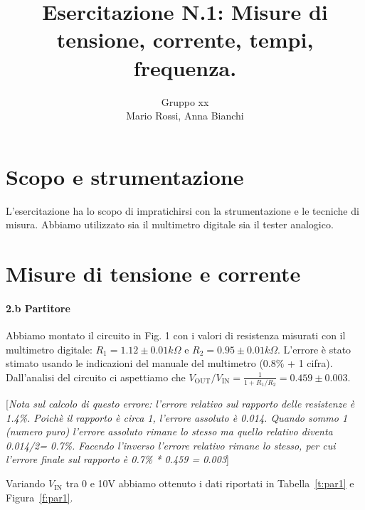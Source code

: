 \documentclass[10pt,a4paper]{article}
\author{Gruppo xx \\ Mario Rossi, Anna Bianchi \rem{non dimenticate i nomi}}
\title{Esercitazione N.1: Misure di tensione, corrente, tempi, frequenza.}
\newcommand{\rem}[1]{[\emph{#1}]}
\begin{document}
\maketitle

\section{Scopo e strumentazione}

L'esercitazione ha lo scopo di impratichirsi con la strumentazione e le tecniche di misura. 
Abbiamo utilizzato sia il multimetro digitale sia il tester analogico. 

\section{Misure di tensione e corrente}
\paragraph{2.b Partitore}
Abbiamo montato il circuito in Fig. 1 con i valori di resistenza misurati con il multimetro digitale: $R_1 = 1.12\pm 0.01 k\Omega$ e $R_2 = 0.95\pm 0.01 k\Omega$. L'errore \`e stato stimato usando le indicazioni del manuale del multimetro ($0.8\%$ + 1 cifra). 
Dall'analisi del circuito ci aspettiamo che $V_\mathrm{OUT}/V_\mathrm{IN} = \frac{1}{1+R_1/R_2}= 0.459 \pm 0.003 $.

\rem{Nota sul calcolo di questo errore: l'errore relativo sul rapporto delle resistenze \`e 1.4\%. Poich\`e il rapporto \`e circa 1, l'errore assoluto \`e 0.014. Quando sommo 1 (numero puro) l'errore assoluto rimane lo stesso ma quello relativo diventa 0.014/2= 0.7\%. Facendo l'inverso l'errore relativo rimane lo stesso, per cui l'errore finale sul rapporto \`e 0.7\% * 0.459 = 0.003}

Variando $V_\mathrm{IN}$ tra 0 e 10V abbiamo ottenuto i dati riportati in Tabella~\ref{t:par1} e Figura~\ref{f:par1}.
\end{document}

